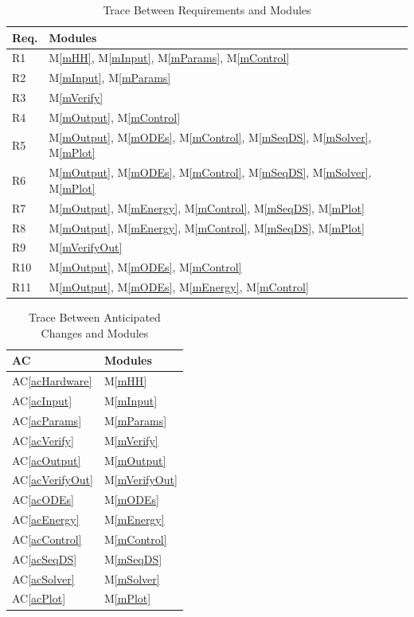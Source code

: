 \documentclass[12pt, titlepage]{article}
\newcommand{\acref}[1]{AC\ref{#1}}
\newcommand{\mref}[1]{M\ref{#1}}
\begin{document}
\begin{table}[H]
\centering
\begin{tabular}{p{} p{}}
\toprule
\textbf{Req.} & \textbf{Modules}\\
\midrule
R1 & \mref{mHH}, \mref{mInput}, \mref{mParams}, \mref{mControl}\\
R2 & \mref{mInput}, \mref{mParams}\\
R3 & \mref{mVerify}\\
R4 & \mref{mOutput}, \mref{mControl}\\
R5 & \mref{mOutput}, \mref{mODEs}, \mref{mControl}, \mref{mSeqDS}, \mref{mSolver}, \mref{mPlot}\\
R6 & \mref{mOutput}, \mref{mODEs}, \mref{mControl}, \mref{mSeqDS}, \mref{mSolver}, \mref{mPlot}\\
R7 & \mref{mOutput}, \mref{mEnergy}, \mref{mControl}, \mref{mSeqDS}, \mref{mPlot}\\
R8 & \mref{mOutput}, \mref{mEnergy}, \mref{mControl}, \mref{mSeqDS}, \mref{mPlot}\\
R9 & \mref{mVerifyOut}\\
R10 & \mref{mOutput}, \mref{mODEs}, \mref{mControl}\\
R11 & \mref{mOutput}, \mref{mODEs}, \mref{mEnergy}, \mref{mControl}\\
\bottomrule
\end{tabular}
\caption{Trace Between Requirements and Modules}
\label{TblRT}
\end{table}

\begin{table}[H]
\centering
\begin{tabular}{p{} p{}}
\toprule
\textbf{AC} & \textbf{Modules}\\
\midrule
\acref{acHardware} & \mref{mHH}\\
\acref{acInput} & \mref{mInput}\\
\acref{acParams} & \mref{mParams}\\
\acref{acVerify} & \mref{mVerify}\\
\acref{acOutput} & \mref{mOutput}\\
\acref{acVerifyOut} & \mref{mVerifyOut}\\
\acref{acODEs} & \mref{mODEs}\\
\acref{acEnergy} & \mref{mEnergy}\\
\acref{acControl} & \mref{mControl}\\
\acref{acSeqDS} & \mref{mSeqDS}\\
\acref{acSolver} & \mref{mSolver}\\
\acref{acPlot} & \mref{mPlot}\\
\bottomrule
\end{tabular}
\caption{Trace Between Anticipated Changes and Modules}
\label{TblACT}
\end{table}
\end{document}
